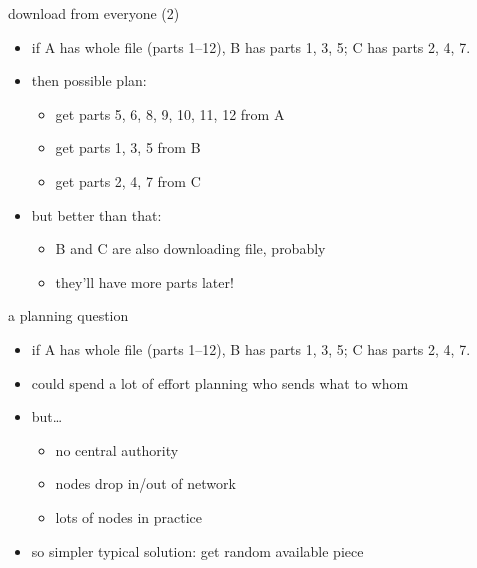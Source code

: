 \begin{frame}{download from everyone (2)}
    \begin{itemize}
    \item if A has whole file (parts 1--12), B has parts 1, 3, 5; C has parts 2, 4, 7.
    \vspace{.5cm}
    \item then possible plan:
        \begin{itemize}
        \item get parts 5, 6, 8, 9, 10, 11, 12 from A
        \item get parts 1, 3, 5 from B
        \item get parts 2, 4, 7 from C
        \end{itemize}
    \item but better than that:
        \begin{itemize}
        \item B and C are also downloading file, probably
        \item they'll have more parts later!
        \end{itemize}
    \end{itemize}
\end{frame}

\begin{frame}{a planning question}
    \begin{itemize}
    \item if A has whole file (parts 1--12), B has parts 1, 3, 5; C has parts 2, 4, 7.
    \vspace{.5cm}
    \item could spend a lot of effort planning who sends what to whom\ldotsS
    \item but\ldots
        \begin{itemize}
        \item no central authority
        \item nodes drop in/out of network
        \item lots of nodes in practice
        \end{itemize}
    \item so simpler typical solution: get random available piece
    \end{itemize}
\end{frame}

